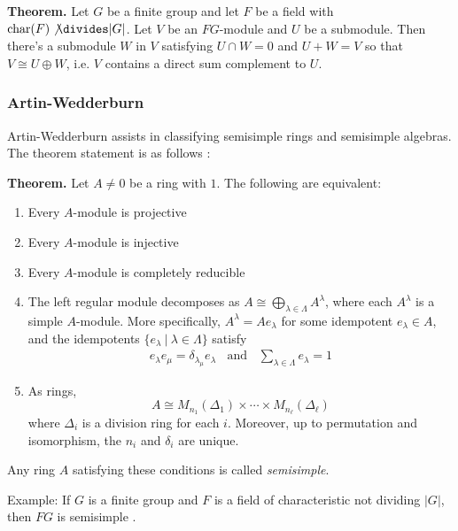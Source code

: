 \documentclass[11pt, reqno]{amsart}
\theoremstyle{plain}
\theoremstyle{definition}
\theoremstyle{example}
\begin{document}
\par
\textbf{Theorem.} Let $G$ be a finite group and let $F$ be a field with $\text{char}(F) \not\divides |G|$. Let $V$ be an $FG$-module and $U$ be a submodule. Then there's a submodule $W$ in $V$ satisfying $U \cap W = 0$ and $U + W = V$ so that $V \cong U \oplus W$, i.e. $V$ contains a direct sum complement to $U$.

\subsubsection{Artin-Wedderburn}

Artin-Wedderburn assists in classifying semisimple rings and semisimple algebras. The theorem statement is as follows \cite[Lec. 16, p. 6]{dau}:

\par
\textbf{Theorem.} Let $A \neq 0$ be a ring with $1$. The following are equivalent:
\begin{enumerate}
\item Every $A$-module is projective

\item Every $A$-module is injective

\item Every $A$-module is completely reducible

\item The left regular module decomposes as $A \cong \bigoplus_{\lambda \in \Lambda} A^{\lambda}$, where each $A^{\lambda}$ is a simple $A$-module. More specifically, $A^{\lambda} = Ae_{\lambda}$ for some idempotent $e_{\lambda} \in A$, and the idempotents $\{e_{\lambda} \ | \ \lambda \in \Lambda\}$ satisfy 
\begin{align*}
e_{\lambda}e_{\mu} = \delta_{\lambda_{\mu}}e_{\lambda} \; \; \text{ and } \; \; \sum_{\lambda \in \Lambda} e_{\lambda} = 1
\end{align*}

\item As rings, $$A \cong M_{n_1}(\Delta_1) \times \cdots \times M_{n_{\ell}}(\Delta_{\ell})$$ where $\Delta_i$ is a division ring for each $i$. Moreover, up to permutation and isomorphism, the $n_i$ and $\delta_i$ are unique.
\end{enumerate}

Any ring $A$ satisfying these conditions is called \textit{semisimple}.

\par
Example: If $G$ is a finite group and $F$ is a field of characteristic not dividing $|G|$, then $FG$ is semisimple \cite[Lec. 16, p. 6]{dau}.
\end{document}
